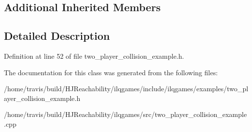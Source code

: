 \subsection*{Additional Inherited Members}


\subsection{Detailed Description}


Definition at line 52 of file two\+\_\+player\+\_\+collision\+\_\+example.\+h.



The documentation for this class was generated from the following files\+:\begin{DoxyCompactItemize}
\item 
/home/travis/build/\+H\+J\+Reachability/ilqgames/include/ilqgames/examples/two\+\_\+player\+\_\+collision\+\_\+example.\+h\item 
/home/travis/build/\+H\+J\+Reachability/ilqgames/src/two\+\_\+player\+\_\+collision\+\_\+example.\+cpp\end{DoxyCompactItemize}
